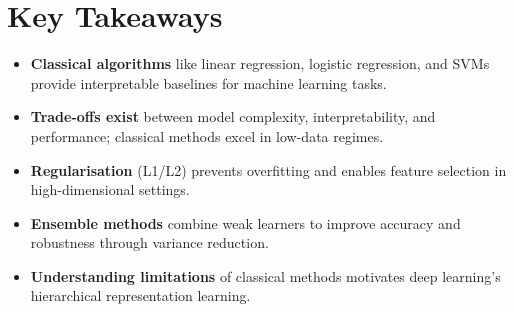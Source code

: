 
\section*{Key Takeaways}

\begin{keytakeaways}
\begin{itemize}[leftmargin=2em]
    \item \textbf{Classical algorithms} like linear regression, logistic regression, and SVMs provide interpretable baselines for machine learning tasks.
    \item \textbf{Trade-offs exist} between model complexity, interpretability, and performance; classical methods excel in low-data regimes.
    \item \textbf{Regularisation} (L1/L2) prevents overfitting and enables feature selection in high-dimensional settings.
    \item \textbf{Ensemble methods} combine weak learners to improve accuracy and robustness through variance reduction.
    \item \textbf{Understanding limitations} of classical methods motivates deep learning's hierarchical representation learning.
\end{itemize}
\end{keytakeaways}


